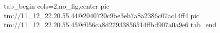  
 
 
 
 

\qqSecOrig


\ifcmt
  tab_begin cols=2,no_fig,center
    pic tm://11_12_22.20.55.44@2040720c9be3eb7a8a2386c07ac14ff4
    pic tm://11_12_22.20.55.45@f056ca8d27933856514ffbd907a0a9e6
  tab_end
\fi

